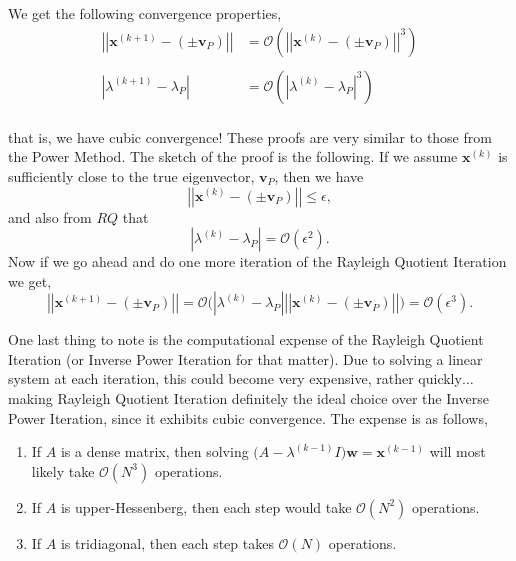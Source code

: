 \documentclass[paper=a4, fontsize=11pt]{scrartcl} %
\numberwithin{equation}{section} %
\numberwithin{figure}{section} %
\numberwithin{table}{section} %
\begin{document}
We get the following convergence properties,
\begin{align*}
\left|\left| \textbf{x}^{(k+1)} - \left( \pm \textbf{v}_P \right) \right|\right| &= \mathcal{O}\left( \left|\left| \textbf{x}^{(k)} - \left( \pm \textbf{v}_P \right)   \right|\right|^3   \right) \\ \\
\left| \lambda^{(k+1)} - \lambda_P \right| &= \mathcal{O}\left( \left| \lambda^{(k)} - \lambda_P  \right|^3   \right) \\
\end{align*}

that is, we have cubic convergence! These proofs are very similar to those from the Power Method. The sketch of the proof is the following. If we assume $\textbf{x}^{(k)}$ is sufficiently close to the true eigenvector, $\textbf{v}_P$, then we have
 $$\left|\left|  \textbf{x}^{(k)} - \left( \pm \textbf{v}_P \right)   \right|\right| \leq \epsilon,$$
and also from $RQ$ that 
$$\left| \lambda^{(k)} - \lambda_P  \right| = \mathcal{O}\left( \epsilon^2 \right).$$
Now if we go ahead and do one more iteration of the Rayleigh Quotient Iteration we get,
$$ \left|\left| \textbf{x}^{(k+1)} - \left( \pm \textbf{v}_P \right) \right|\right| = \mathcal{O}\Bigg(  \left| \lambda^{(k)} - \lambda_P  \right|       \left|\left| \textbf{x}^{(k)} - \left( \pm \textbf{v}_P \right) \right|\right|    \Bigg) = \mathcal{O}\left( \epsilon^3  \right).$$

One last thing to note is the computational expense of the Rayleigh Quotient Iteration (or Inverse Power Iteration for that matter). Due to solving a linear system at each iteration, this could become very expensive, rather quickly$\ldots$making Rayleigh Quotient Iteration definitely the ideal choice over the Inverse Power Iteration, since it exhibits cubic convergence. The expense is as follows,
\begin{enumerate}
\item If $A$ is a dense matrix, then solving $\bigg(A-\lambda^{(k-1)} I\bigg)\textbf{w} = \textbf{x}^{(k-1)}$ will most likely take $\mathcal{O}\left(N^3 \right)$ operations.
\item If $A$ is upper-Hessenberg, then each step would take $\mathcal{O}\left( N^2  \right)$ operations.
\item If $A$ is tridiagonal, then each step takes $\mathcal{O}(N)$ operations. 
\end{enumerate}
\end{document}
